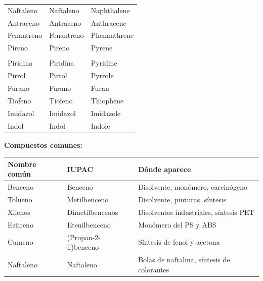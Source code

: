 \begin{longtable}{L{5.0cm} L{7.5cm} L{5.0cm}}
\midrule
Naftaleno  & Naftaleno  & Naphthalene \\
Antraceno  & Antraceno  & Anthracene \\
Fenantreno & Fenantreno & Phenanthrene \\
Pireno     & Pireno     & Pyrene \\
\midrule{}
 \\
\midrule
Piridina & Piridina & Pyridine \\
Pirrol   & Pirrol   & Pyrrole \\
Furano   & Furano   & Furan \\
Tiofeno  & Tiofeno  & Thiophene \\
Imidazol & Imidazol & Imidazole \\
Indol    & Indol    & Indole \\
\end{longtable}

\textbf{Compuestos comunes:}

\begin{longtable}{L{4.0cm} L{5.0cm} L{8.5cm}}
\toprule
\textbf{Nombre común} & \textbf{IUPAC} & \textbf{Dónde aparece} \\
\midrule\endhead\bottomrule\endlastfoot
Benceno   & Benceno               & Disolvente, monómero, carcinógeno \\
Tolueno   & Metilbenceno          & Disolvente, pinturas, síntesis \\
Xilenos   & Dimetilbencenos       & Disolventes industriales, síntesis PET \\
Estireno  & Etenilbenceno         & Monómero del PS y ABS \\
Cumeno    & (Propan-2-il)benceno  & Síntesis de fenol y acetona \\
Naftaleno & Naftaleno             & Bolas de naftalina, síntesis de colorantes \\
\end{longtable}

\newpage


{}
\section*{\centering\fontsize{12}{18}}


